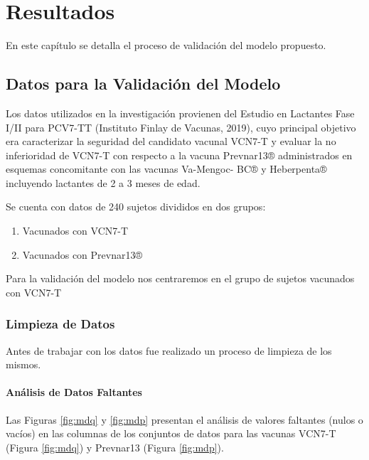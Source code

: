 \chapter{Resultados}\label{chapter:resultados}

En este capítulo se detalla el proceso de validación del modelo propuesto. 

\section{Datos para la Validación del Modelo}
Los datos utilizados en la investigación provienen del Estudio en Lactantes Fase I/II para PCV7-TT (Instituto Finlay de Vacunas, 2019), cuyo principal objetivo era caracterizar la seguridad del candidato vacunal VCN7-T y evaluar la no inferioridad de VCN7-T con respecto a la vacuna Prevnar13® administrados en esquemas concomitante con las vacunas Va-Mengoc- BC® y Heberpenta® incluyendo lactantes de 2 a 3 meses de edad.

Se cuenta con datos de 240 sujetos divididos en dos grupos:
\begin{enumerate}
    \item Vacunados con VCN7-T
    \item Vacunados con Prevnar13®
\end{enumerate}

Para la validación del modelo nos centraremos en el grupo de sujetos vacunados con VCN7-T

\subsection{Limpieza de Datos}
Antes de trabajar con los datos fue realizado un proceso de limpieza de los mismos. 


\subsubsection{Análisis de Datos Faltantes}

Las Figuras \ref{fig:mdq} y \ref{fig:mdp} presentan el análisis de valores faltantes (nulos o vacíos) en las columnas de los conjuntos de datos para las vacunas VCN7-T (Figura \ref{fig:mdq}) y Prevnar13 (Figura \ref{fig:mdp}). 

